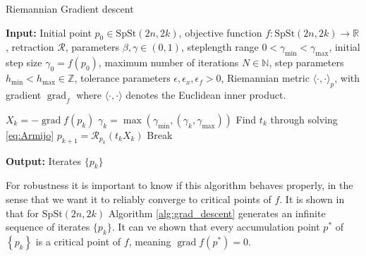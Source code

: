 \begin{algorithm}[H]
    \caption{Riemannian Gradient descent}\label{alg:grad_descent}
    \textbf{Input:} Initial point $p_{0}\in \mathrm{SpSt}(2n, 2k)$, objective function $f\colon\mathrm{SpSt}(2n, 2k)\to \mathbb{R}$, retraction $\mathcal{R}$, parameters $\beta, \gamma \in(0,1)$, steplength range $0<\gamma_{\text{min}}<\gamma_{\text{max}}$, initial step size $\gamma_{0}=f(p_{0})$, maximum number of iterations $N\in \mathbb{N}$, step parameters $h_{\text{min}}<h_{\text{max}}\in \mathbb{Z}$, tolerance parameters $\epsilon, \epsilon_{x}, \epsilon_{f}>0$, Riemannian metric $\langle \cdot,\cdot \rangle_{p}$, with gradient $\operatorname*{grad}_{f}$ where $\langle \cdot,\cdot \rangle$ denotes the Euclidean inner product.
    \begin{algorithmic}[1]
        \State $X_{k}=-\operatorname{grad}f(p_{k})$
        \State $\gamma_{k}=\operatorname{max}(\gamma_{\text{min}},(\gamma_{k}, \gamma_{\text{max}}))$
        \State Find $t_{k}$ through solving \eqref{eq:Armijo}
        \State $p_{k+1}=\mathcal{R}_{p_{k}}(t_{k}X_{k})$
        \State Break
        \EndIf
        \EndIf
        \EndFor
    \end{algorithmic}
    \textbf{Output:} Iterates $\{p_{k}\}$
\end{algorithm}

For robustness it is important to know if this algorithm behaves properly, in the sense that we want it to reliably converge to critical points of $f$. It is shown in \cite[Cor.~5.8]{GaoSonAbsilStykel2021} that for $\mathrm{SpSt}(2n, 2k)$ Algorithm \ref{alg:grad_descent} generates an infinite sequence of iterates $\{p_{k}\}$\cite[Prop.~5.6]{GaoSonAbsilStykel2021}. It can ve shown that every accumulation point $p^*$ of $\left\{ p_{k} \right\}$ is a critical point of $f$, meaning $\operatorname{grad}f(p^{*})=0$. 